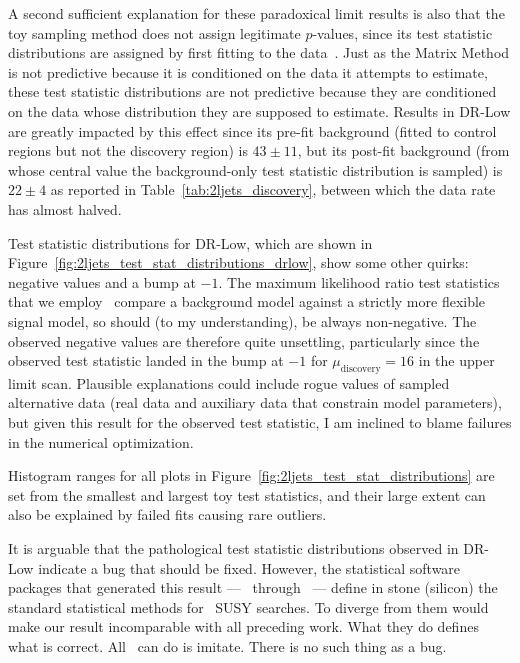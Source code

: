 A second sufficient explanation for these paradoxical limit results is also
that the toy sampling method does not assign legitimate $p$-values, since its
test statistic distributions are assigned by first fitting to the
data~\cite{cern2011procedure}.
Just as the Matrix Method is not predictive because it is conditioned on the
data it attempts to estimate,
these test statistic distributions are not predictive because they are
conditioned on the data whose distribution they are supposed to estimate.
Results in DR-Low are greatly impacted by this effect since its
pre-fit background
(fitted to control regions but not the discovery region)
is $43 \pm 11$, but its post-fit background (from whose central value
the background-only test statistic distribution is sampled) is
$22 \pm 4$ as reported in Table~\ref{tab:2ljets_discovery},
between which the data rate has almost halved.

Test statistic distributions for DR-Low,
which are shown in Figure~\ref{fig:2ljets_test_stat_distributions_drlow},
show some other quirks: negative values and a bump at $-1$.
The maximum likelihood ratio test statistics that we
employ~\cite{Cowan:2010js} compare a background model against a strictly more
flexible signal model, so should (to my understanding), be always non-negative.
The observed negative values are therefore quite unsettling, particularly since
the observed test statistic landed in the bump at $-1$ for
$\mu_\textrm{discovery} = 16$ in the upper limit scan.
Plausible explanations could include rogue values of sampled alternative data
(real data and auxiliary data that constrain model parameters), but given this
result for the observed test statistic, I am inclined to blame failures in
the numerical optimization.

Histogram ranges for all plots in
Figure~\ref{fig:2ljets_test_stat_distributions} are
set from the smallest and largest toy test statistics, and their large extent
can also be explained by failed fits causing rare outliers.

It is arguable that the pathological test statistic distributions
observed in DR-Low indicate a bug that should be fixed.
However, the statistical software packages that generated this result
--- \roofit\ through \histfitter\ ---
define in stone (silicon) the standard statistical methods for \atlas\ SUSY
searches.
To diverge from them would make our result incomparable with all preceding
work.
What they do defines what is correct.
All \pyhf\ can do is imitate.
There is no such thing as a bug.

